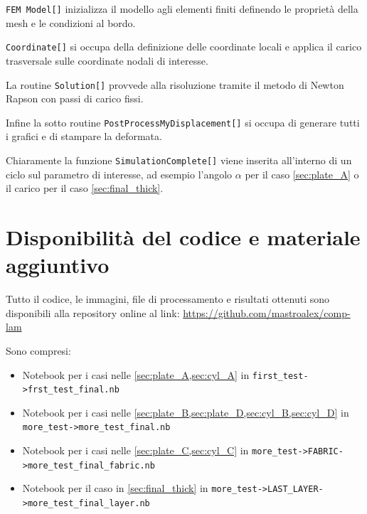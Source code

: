\documentclass[a4paper,num-refs]{oup-contemporary}
\begin{document}
 \texttt{FEM Model[]} inizializza il modello agli elementi finiti definendo le proprietà della mesh e le condizioni al bordo.
 
 \texttt{Coordinate[]} si occupa della definizione delle coordinate locali e applica il carico trasversale sulle coordinate nodali di interesse.
 
 La routine  \texttt{Solution[]} provvede alla risoluzione tramite il metodo di Newton Rapson con passi di carico fissi. 
 
 Infine la sotto routine \texttt{PostProcessMyDisplacement[]} si occupa di generare tutti i grafici e di stampare la deformata.
 
Chiaramente la funzione \texttt{SimulationComplete[]} viene inserita all'interno di un ciclo sul parametro di interesse, ad esempio l'angolo $\alpha$ per il caso \cref{sec:plate_A} o il carico per il caso \cref{sec:final_thick}.



\section{Disponibilità del codice e materiale aggiuntivo}

Tutto il codice, le immagini, file di processamento e risultati ottenuti sono disponibili alla repository online al link: \url{https://github.com/mastroalex/comp-lam}

Sono compresi:

\begin{itemize}
	\item Notebook per i casi nelle \cref{sec:plate_A,sec:cyl_A} in \texttt{first\_test->frst\_test\_final.nb}
	\item  Notebook per i casi nelle \cref{sec:plate_B,sec:plate_D,sec:cyl_B,sec:cyl_D} in \texttt{more\_test->more\_test\_final.nb}
	\item  Notebook per i casi nelle \cref{sec:plate_C,sec:cyl_C} in \texttt{more\_test->FABRIC->more\_test\_final\_fabric.nb}
	\item  Notebook per il caso in \cref{sec:final_thick} in \texttt{more\_test->LAST\_LAYER->more\_test\_final\_layer.nb}

\end{itemize}





\newpage

\end{document}
